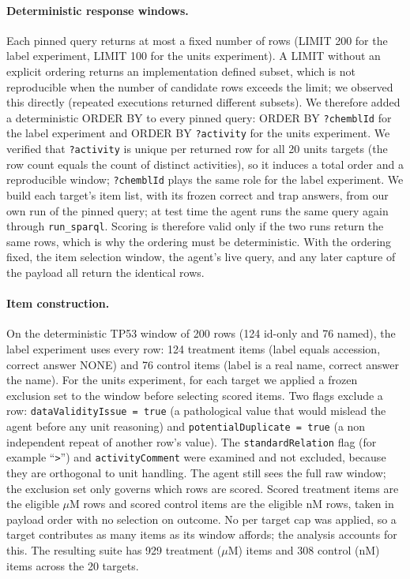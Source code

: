 \documentclass[sigconf]{ceurart}
\begin{document}
\paragraph{Deterministic response windows.}
Each pinned query returns at most a fixed number of rows (LIMIT 200 for the label
experiment, LIMIT 100 for the units experiment). A LIMIT without an explicit ordering returns an
implementation defined subset, which is not reproducible when the number of
candidate rows exceeds the limit; we observed this directly (repeated executions
returned different subsets). We therefore added a deterministic ORDER BY to every
pinned query: ORDER BY \texttt{?chemblId} for the label experiment and ORDER BY
\texttt{?activity} for the units experiment. We verified that \texttt{?activity} is unique
per returned row for all 20 units targets (the row count equals the count of
distinct activities), so it induces a total order and a reproducible window;
\texttt{?chemblId} plays the same role for the label experiment. We build each
target's item list, with its frozen correct and trap answers, from our own run of
the pinned query; at test time the agent runs the same query again through
\texttt{run\_sparql}. Scoring is therefore valid only if the two runs return the
same rows, which is why the ordering must be deterministic. With the ordering fixed,
the item selection window, the agent's live query, and any later capture of the
payload all return the identical rows.

\paragraph{Item construction.}
On the deterministic TP53 window of 200 rows (124 id-only and 76 named), the label
experiment uses every row: 124 treatment items (label equals accession, correct answer
NONE) and 76 control items (label is a real name, correct answer the name). For the
units experiment, for each target we applied a frozen exclusion set to the window before
selecting scored items. Two flags exclude a row: \texttt{dataValidityIssue = true}
(a pathological value that would mislead the agent before any unit reasoning) and
\texttt{potentialDuplicate = true} (a non independent repeat of another row's
value). The \texttt{standardRelation} flag (for example ``\texttt{>}'') and
\texttt{activityComment} were examined and not excluded, because they are orthogonal
to unit handling. The agent still sees the full raw window; the exclusion set only
governs which rows are scored. Scored treatment items are the eligible $\mu$M rows and
scored control items are the eligible nM rows, taken in payload order with no
selection on outcome. No per target cap was applied, so a target contributes as
many items as its window affords; the analysis accounts for this. The resulting
suite has 929 treatment ($\mu$M) items and 308 control (nM) items across the 20 targets.
\end{document}
